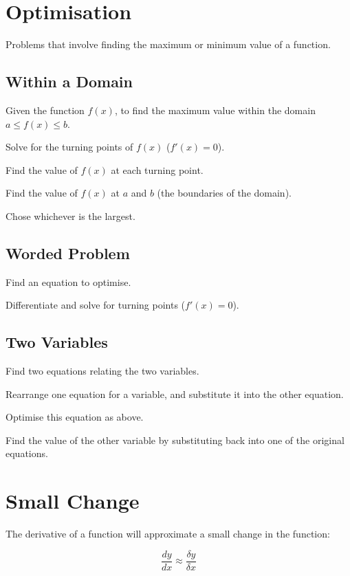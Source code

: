 \documentclass[a4paper,11pt]{article}
\begin{document}
\section{Optimisation}

Problems that involve finding the maximum or minimum value of a function.


\subsection{Within a Domain}

Given the function $f(x)$, to find the maximum value within the domain
$a \leq f(x) \leq b$.

Solve for the turning points of $f(x)$ ($f'(x) = 0$).

Find the value of $f(x)$ at each turning point.

Find the value of $f(x)$ at $a$ and $b$ (the boundaries of the domain).

Chose whichever is the largest.


\subsection{Worded Problem}

Find an equation to optimise.

Differentiate and solve for turning points ($f'(x) = 0$).


\subsection{Two Variables}

Find two equations relating the two variables.

Rearrange one equation for a variable, and substitute it into the other
equation.

Optimise this equation as above.

Find the value of the other variable by substituting back into one of the
original equations.




\section{Small Change}

The derivative of a function will approximate a small change in the function:

$$
\frac{dy}{dx} \approx \frac{\delta y}{\delta x}
$$
\end{document}
